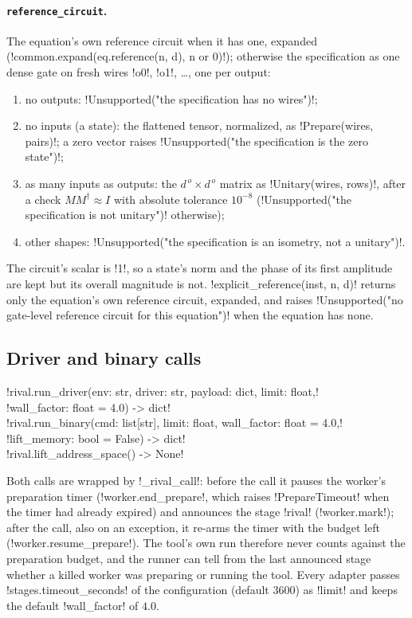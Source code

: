 \paragraph{\texttt{reference\_circuit}.} The equation's own reference circuit when it has one, expanded (\py!common.expand(eq.reference(n, d), n or 0)!); otherwise the specification as one dense gate on fresh wires \code!o0!, \code!o1!, \ldots, one per output:
\begin{enumerate}
\item no outputs: \py!Unsupported("the specification has no wires")!;
\item no inputs (a state): the flattened tensor, normalized, as \py!Prepare(wires, pairs)!; a zero vector raises \py!Unsupported("the specification is the zero state")!;
\item as many inputs as outputs: the $d^{\,o}\times d^{\,o}$ matrix as \py!Unitary(wires, rows)!, after a check $MM^\dagger\approx I$ with absolute tolerance $10^{-8}$ (\py!Unsupported("the specification is not unitary")! otherwise);
\item other shapes: \py!Unsupported("the specification is an isometry, not a unitary")!.
\end{enumerate}
The circuit's scalar is \code!1!, so a state's norm and the phase of its first amplitude are kept but its overall magnitude is not. \py!explicit_reference(inst, n, d)! returns only the equation's own reference circuit, expanded, and raises \py!Unsupported("no gate-level reference circuit for this equation")! when the equation has none.

\subsection{Driver and binary calls}\label{sec:bench-tools-calls}

\begin{signature}
\py!rival.run_driver(env: str, driver: str, payload: dict, limit: float,!\\
\quad\py!wall_factor: float = 4.0) -> dict!\\
\py!rival.run_binary(cmd: list[str], limit: float, wall_factor: float = 4.0,!\\
\quad\py!lift_memory: bool = False) -> dict!\\
\py!rival.lift_address_space() -> None!
\end{signature}

Both calls are wrapped by \py!_rival_call!: before the call it pauses the worker's preparation timer (\py!worker.end_prepare!, which raises \py!PrepareTimeout! when the timer had already expired) and announces the stage \code!rival! (\py!worker.mark!); after the call, also on an exception, it re-arms the timer with the budget left (\py!worker.resume_prepare!). The tool's own run therefore never counts against the preparation budget, and the runner can tell from the last announced stage whether a killed worker was preparing or running the tool. Every adapter passes \code!stages.timeout_seconds! of the configuration (default $3600$) as \py!limit! and keeps the default \py!wall_factor! of $4.0$.


